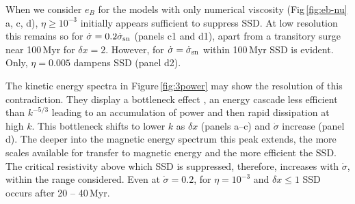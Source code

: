 \documentclass[preprint2]{aastex63}
\newcommand\SNr{\dot\sigma_{\rm sn}}
\newcommand\Ms{M_{\rm s}}
\newcommand\dx{ {\delta x}}
\begin{document}
 {When we consider $e_B$ for the models {with} only numerical
 viscosity
 (Fig\,\ref{fig:eb-nu} a, c, d), $\eta\geq10^{-3}$ initially appears
 sufficient to suppress SSD.
 At low resolution this remains so for $\dot\sigma=0.2\SNr$ (panels c1 and d1),
 apart from a transitory surge near 100\,Myr for $\dx=2$.
 However, for $\dot\sigma=\SNr$ within 100\,Myr SSD is evident.
 Only, $\eta=0.005$ dampens SSD (panel d2).}

 {The kinetic energy spectra in Figure\,\ref{fig:3power}} may
 show the resolution of this contradiction.
 They display a bottleneck effect \citep{Falkovich94,HBD03}, an energy cascade
 less efficient than $k^{-5/3}$
 leading to an accumulation of power and then rapid dissipation at high $k$.
 This bottleneck shifts to lower $k$ as $\dx$
 {(panels a--c) and $\dot\sigma$ increase (panel d).}
 {The deeper into the magnetic energy spectrum this peak extends, the more 
 scales available for transfer to magnetic energy and the more
 efficient the SSD.
 The critical resistivity above which SSD is suppressed, therefore, 
 increases with $\dot\sigma$, within the range considered. 
 Even at $\dot\sigma=0.2$, for $\eta=10^{-3}$ and $\dx\leq1$ SSD occurs after
 20 -- 40\,Myr.}
\end{document}
